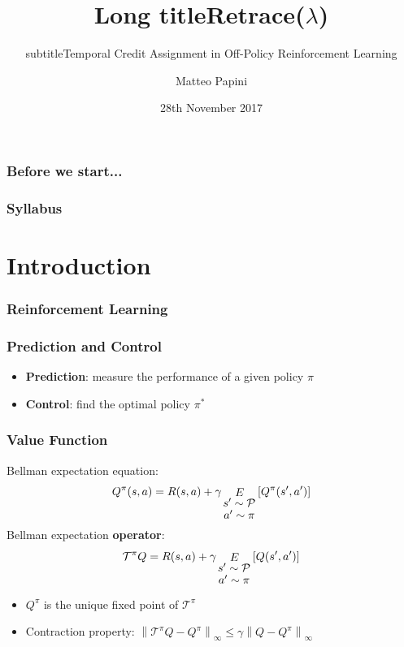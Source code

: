 \documentclass{beamer}
\title[Short title]{Long title}
\subtitle{subtitle}
\title[Retrace]{Retrace($\lambda$)}
\subtitle{Temporal Credit Assignment in Off-Policy Reinforcement Learning}
\author[Matteo Papini]{Matteo Papini}
\date[28/11/17]{28th November 2017}
\newcommand{\expect}[2]{\mathop{E}_{#1}\left[#2\right]}
\newcommand{\norm}[2][\infty]{\left\|#2\right\|_{#1}}
\begin{document}

\begin{frame}
\titlepage
\end{frame}

\addtocounter{framenumber}{-1}


\begin{frame}
\frametitle{Before we start...}
\end{frame}

\begin{frame}
\frametitle{Syllabus}
\tableofcontents
\end{frame}

\section{Introduction}
\frame{\tableofcontents[currentsection]}

\begin{frame}
\frametitle{Reinforcement Learning}
\end{frame}

\begin{frame}
\frametitle{Prediction and Control}
\begin{itemize}
\item<1-> \textbf{Prediction}: measure the performance of a given policy $\pi$

\item<2> \textbf{Control}: find the optimal policy $\pi^*$
\end{itemize}
\end{frame}

\begin{frame}
\frametitle{Value Function}
Bellman expectation equation:
\[
	Q^\pi(s,a) = R(s,a) + \gamma\expect{
	\shortstack{$s'\sim\mathcal{P}$\\$a'\sim\pi$}}{Q^\pi(s',a')}
\]
\pause
Bellman expectation \textbf{operator}:
\[
	\mathcal{T^{\pi}}Q = 
	R(s,a) + \gamma\expect{
		\shortstack{$s'\sim\mathcal{P}$\\$a'\sim\pi$}}{Q(s',a')}
\]
\begin{itemize}
\item<3-> $Q^{\pi}$ is the unique fixed point of $\mathcal{T^{\pi}}$
\item<4-> Contraction property: $\norm[\infty]{\mathcal{T}^{\pi}Q-Q^{\pi}} \leq \gamma\norm[\infty]{Q-Q^{\pi}}$
\end{itemize}
\end{frame}
\end{document}
